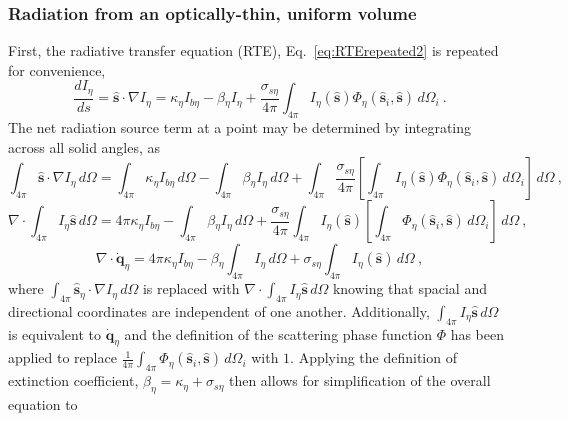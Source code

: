 \subsubsection{Radiation from an optically-thin, uniform volume}
First, the radiative transfer equation (RTE), Eq.~\ref{eq:RTErepeated2} is repeated for convenience,
\begin{equation}
    \frac{dI_\eta{}}{ds} = \hat{\textbf{s}} \cdot \nabla{I_\eta{}} = \kappa{}_\eta{}I_{b\eta{}}-\beta{}_{\eta{}}I_\eta{}+\frac{\sigma{}_{s\eta{}}}{4\pi}\int_{4\pi{}}{I_\eta{}(\hat{\textbf{s}})\Phi_\eta{}(\hat{\textbf{s}}_i,\hat{\textbf{s}})}\,d\Omega{}_i \ .
    \label{eq:RTErepeated2}
\end{equation}
The net radiation source term at a point may be determined by integrating across all solid angles, as
\begin{equation}
    \int_{4\pi}\hat{\textbf{s}} \cdot \nabla{I_\eta{}}\,d\Omega = \int_{4\pi} { \kappa{}_\eta{}I_{b\eta{}} }\,d\Omega-\int_{4\pi}\beta{}_{\eta{}}I_\eta{}\,d\Omega+\int_{4\pi}\frac{\sigma{}_{s\eta{}}}{4\pi}\left[\int_{4\pi{}}{I_\eta{}(\hat{\textbf{s}})\Phi_\eta{}(\hat{\textbf{s}}_i,\hat{\textbf{s}})}\,d\Omega{}_i\right]\,d\Omega \ ,
\end{equation}
\begin{equation}
    \nabla \cdot \int_{4\pi}I_\eta{}\hat{\textbf{s}}\,d\Omega = 4\pi\kappa{}_\eta{}I_{b\eta{}}-\int_{4\pi}\beta{}_{\eta{}}I_\eta{}\,d\Omega+\frac{\sigma{}_{s\eta{}}}{4\pi}\int_{4\pi}I_\eta{}(\hat{\textbf{s}})\left[\int_{4\pi{}}{\Phi_\eta{}(\hat{\textbf{s}}_i,\hat{\textbf{s}})}\,d\Omega{}_i\right]\,d\Omega \ ,
\end{equation}
\begin{equation}
    \nabla \cdot \dot{\textbf{q}}_\eta{} = 4\pi\kappa{}_\eta{}I_{b\eta{}}-\beta{}_{\eta{}}\int_{4\pi}I_\eta{}\,d\Omega+\sigma{}_{s\eta{}}\int_{4\pi}I_\eta{}(\hat{\textbf{s}})\,d\Omega \ ,
\end{equation}
where $\int_{4\pi}\hat{\textbf{s}}_\eta{} \cdot \nabla{I_\eta{}}\,d\Omega$ is replaced with $\nabla \cdot \int_{4\pi}I_\eta{}\hat{\textbf{s}}\,d\Omega$ knowing that spacial and directional coordinates are independent of one another.
Additionally, $\int_{4\pi}I_\eta{}\hat{\textbf{s}}\,d\Omega$ is equivalent to $\dot{\textbf{q}}_\eta{}$ and the definition of the scattering phase function $\Phi$ has been applied to replace $\frac{1}{4\pi}\int_{4\pi{}}{\Phi_\eta{}(\hat{\textbf{s}}_i,\hat{\textbf{s}})}\,d\Omega{}_i$ with $1$.
Applying the definition of extinction coefficient, $\beta_\eta=\kappa_\eta+\sigma_{s\eta}$ then allows for simplification of the overall equation to
